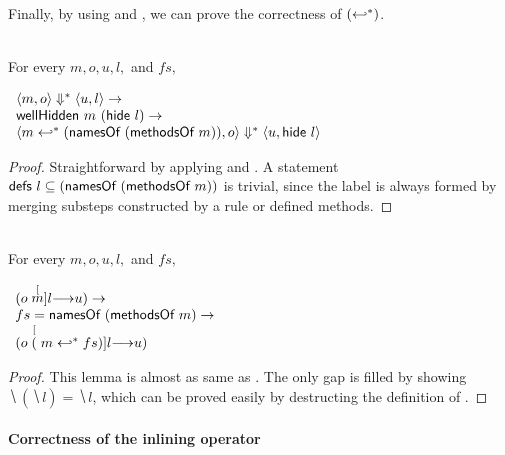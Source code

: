 Finally, by using  and
, we can prove the correctness of
$(\inlinedmssymb)$.

\begin{lemma}
  \label{lem-inlinedmssub}
  \mbox{}\\
  For every $m, o, u, l,$ and $fs,$
  \begin{center}
    \begin{math}
      \begin{array}{l}
        \semsss{m}{o}{u}{l} \to \\
        \wellhidden{m}{(\hide{l})} \to \\
        \semsss{\inlinedms{m}{(\namesof{(\methsofm{m})})}}{o}{u}{\hide{l}}
      \end{array}
    \end{math}
  \end{center}
\end{lemma}
\begin{proof}
  Straightforward by applying  and
  . A statement $\defsof{l} \subseteq
  (\namesof{(\methsofm{m})})$ is trivial, since the label is always
  formed by merging substeps constructed by a rule or defined methods.
\end{proof}

\begin{lemma}
  \label{lem-inlinedms}
  \mbox{}\\
  For every $m, o, u, l,$ and $fs,$
  \begin{center}
    \begin{math}
      \begin{array}{l}
        (\semstep{m}{o}{u}{l}) \to \\
        fs = \namesof{(\methsofm{m})} \to \\
        (\semstep{(\inlinedms{m}{fs})}{o}{u}{l})
      \end{array}
    \end{math}
  \end{center}
\end{lemma}
\begin{proof}
  This lemma is almost as same as . The only
  gap is filled by showing $\hide{(\hide{l})} = \hide{l}$, which can
  be proved easily by destructing the definition of \hidesym{}.
\end{proof}

\paragraph{Correctness of the inlining operator}

